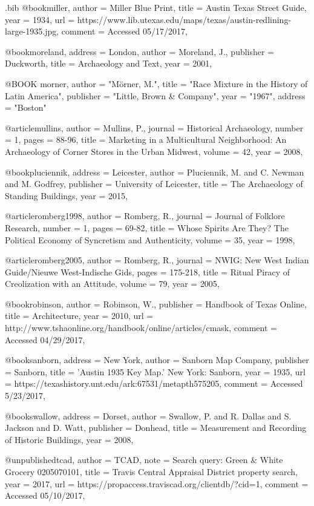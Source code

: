 \begin{filecontents}{\IJSRAidentifier.bib}
@book{miller,
	author = {Miller Blue Print},
	title = {Austin Texas Street Guide},
	year = {1934},
	url = {https://www.lib.utexas.edu/maps/texas/austin-redlining-large-1935.jpg},
	comment = {Accessed 05/17/2017},
}

@book{moreland,
	address = {London},
	author = {Moreland, J.},
	publisher = {Duckworth},
	title = {Archaeology and Text},
	year = {2001},
}

@BOOK {morner,
	author    = "Mörner, M.",
	title     = "Race Mixture in the History of Latin America",
	publisher = "Little, Brown \& Company",
	year      = "1967",
	address   = "Boston"
}

@article{mullins,
	author = {Mullins, P.},
	journal = {Historical Archaeology},
	number = {1},
	pages = {88-96},
	title = {Marketing in a Multicultural Neighborhood: An Archaeology of Corner Stores in the Urban Midwest},
	volume = {42},
	year = {2008},
}

@book{pluciennik,
	address = {Leicester},
	author = {Pluciennik, M. and C. Newman and M. Godfrey},
	publisher = {University of Leicester},
	title = {The Archaeology of Standing Buildings},
	year = {2015},
}%

@article{romberg1998,
	author = {Romberg, R.},
	journal = {Journal of Folklore Research},
	number = {1},
	pages = {69-82},
	title = {Whose Spirits Are They? The Political Economy of Syncretism and Authenticity},
	volume = {35},
	year = {1998},
}

@article{romberg2005,
	author = {Romberg, R.},
	journal = {NWIG: New West Indian Guide/Nieuwe West-Indische Gids},
	pages = {175-218},
	title = {Ritual Piracy of Creolization with an Attitude},
	volume = {79},
	year = {2005},
}

@book{robinson,
	author = {Robinson, W.},
	publisher = {Handbook of Texas Online},
	title = {Architecture},
	year = {2010},
	url = {http://www.tshaonline.org/handbook/online/articles/cmask},
	comment = {Accessed 04/29/2017},
}

@book{sanborn,
	address = {New York},
	author = {Sanborn Map Company},
	publisher = {Sanborn},
	title = {'Austin 1935 Key Map.' New York: Sanborn},
	year = {1935},
	url = {https://texashistory.unt.edu/ark:67531/metapth575205},
	comment = {Accessed 5/23/2017},
}

@book{swallow,
	address = {Dorset},
	author = {Swallow, P. and R. Dallas and S. Jackson and D. Watt},
	publisher = {Donhead},
	title = {Measurement and Recording of Historic Buildings},
	year = {2008},
}%

@unpublished{tcad,
	author = {TCAD},
	note = {Search query: Green \& White Grocery 0205070101},
	title = {Travis Central Appraisal District property search},
	year = {2017},
	url = {https://propaccess.traviscad.org/clientdb/?cid=1},
	comment = {Accessed 05/10/2017},
}

\end{filecontents}
